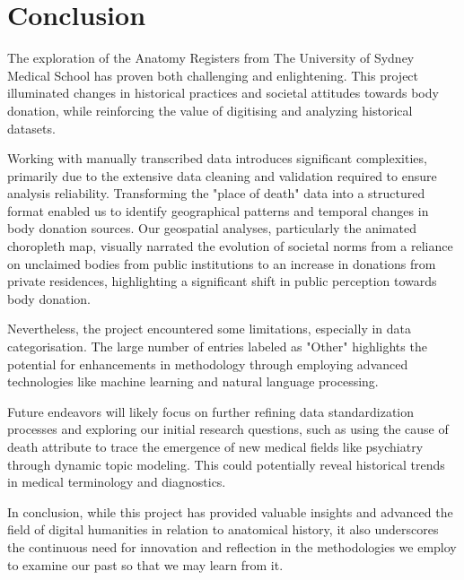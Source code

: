 \section{Conclusion}

The exploration of the Anatomy Registers from The University of Sydney Medical School has proven both challenging and enlightening. This project illuminated changes in historical practices and societal attitudes towards body donation, while reinforcing the value of digitising and analyzing historical datasets.

Working with manually transcribed data introduces significant complexities, primarily due to the extensive data cleaning and validation required to ensure analysis reliability. Transforming the "place of death" data into a structured format enabled us to identify geographical patterns and temporal changes in body donation sources. Our geospatial analyses, particularly the animated choropleth map, visually narrated the evolution of societal norms from a reliance on unclaimed bodies from public institutions to an increase in donations from private residences, highlighting a significant shift in public perception towards body donation.

Nevertheless, the project encountered some limitations, especially in data categorisation. The large number of entries labeled as "Other" highlights the potential for enhancements in methodology through employing advanced technologies like machine learning and natural language processing.

Future endeavors will likely focus on further refining data standardization processes and exploring our initial research questions, such as using the cause of death attribute to trace the emergence of new medical fields like psychiatry through dynamic topic modeling. This could potentially reveal historical trends in medical terminology and diagnostics.

In conclusion, while this project has provided valuable insights and advanced the field of digital humanities in relation to anatomical history, it also underscores the continuous need for innovation and reflection in the methodologies we employ to examine our past so that we may learn from it.